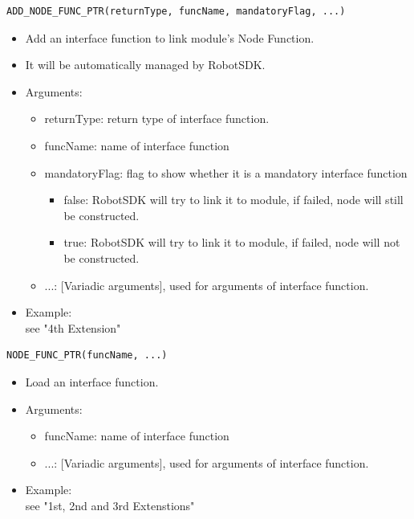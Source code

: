 \documentclass[a4paper,10pt]{book}
\begin{document}
\begin{mdframed}
\begin{verbatim}
ADD_NODE_FUNC_PTR(returnType, funcName, mandatoryFlag, ...)
\end{verbatim}
\begin{itemize}
 \item Add an interface function to link module's Node Function.
 \item It will be automatically managed by RobotSDK.
 \item Arguments:
 \begin{itemize}
  \item returnType: return type of interface function.
  \item funcName: name of interface function
  \item mandatoryFlag: flag to show whether it is a mandatory interface function
  \begin{itemize}
   \item false: RobotSDK will try to link it to module, if failed, node will still be constructed.
   \item true: RobotSDK will try to link it to module, if failed, node will not be constructed.
  \end{itemize}
  \item ...: [Variadic arguments], used for arguments of interface function. 
 \end{itemize}
 \item Example: \\ see "4th Extension"
\end{itemize}
\end{mdframed}

\begin{mdframed}
\begin{verbatim}
NODE_FUNC_PTR(funcName, ...)
\end{verbatim}
\begin{itemize}
 \item Load an interface function.
 \item Arguments:
 \begin{itemize}
  \item funcName: name of interface function
  \item ...: [Variadic arguments], used for arguments of interface function. 
 \end{itemize}
 \item Example: \\ see "1st, 2nd and 3rd Extenstions"
\end{itemize}
\end{mdframed}
\end{document}
